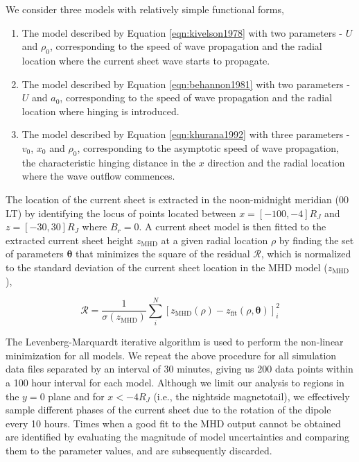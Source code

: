 We consider three models with relatively simple functional forms,
\begin{enumerate}
    \item The  model described by Equation \ref{eqn:kivelson1978} with two parameters - $U$ and $\rho_0$, corresponding to the speed of wave propagation and the radial location where the current sheet wave starts to propagate. 
    \item The  model described by Equation \ref{eqn:behannon1981} with two parameters - $U$ and $a_0$, corresponding to the speed of wave propagation and the radial location where hinging is introduced.
    \item The  model described by Equation \ref{eqn:khurana1992} with three parameters - $v_0$, $x_0$ and $\rho_0$, corresponding to the asymptotic speed of wave propagation, the characteristic hinging distance in the $x$ direction and the radial location where the wave outflow commences. 
\end{enumerate}

The location of the current sheet is extracted in the noon-midnight meridian (00 LT) by identifying the locus of points located between $x=[-100, -4] R_J$ and $z=[-30, 30] R_J$ where  $B_r=0$. A current sheet model is then fitted to the extracted current sheet height $z_\text{MHD}$ at a given radial location $\rho$ by finding the set of parameters $\boldsymbol\theta$ that minimizes the square of the residual $\mathcal{R}$, which is normalized to the standard deviation of the current sheet location in the MHD model ($z_\text{MHD}$),

\begin{equation}
    \mathcal{R} = \frac{1}{\sigma(z_\text{MHD})} \sum_i^N \left[ z_\text{MHD}(\rho) - z_\text{fit} (\rho, \boldsymbol\theta) \right]_i^2
\end{equation}

The Levenberg-Marquardt iterative algorithm \cite{Newville2018Non-LinearPython,Levenberg1944ASquares} is used to perform the non-linear minimization for all models. We repeat the above procedure for all simulation data files separated by an interval of 30 minutes, giving us 200 data points within a 100 hour interval for each model. Although we limit our analysis to regions in the $y=0$ plane and for $x < -4 R_J$ (i.e., the nightside magnetotail), we effectively sample different phases of the current sheet due to the rotation of the dipole every 10 hours. Times when a good fit to the MHD output cannot be obtained are identified by evaluating the magnitude of model uncertainties and comparing them to the parameter values, and are subsequently discarded. 


